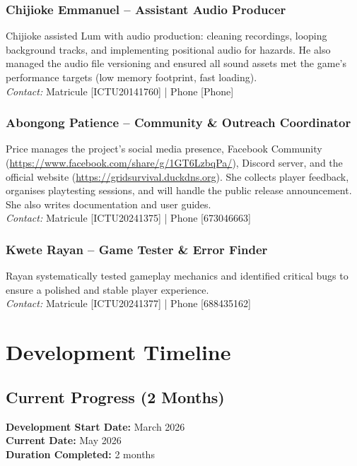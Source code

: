 \documentclass[12pt,a4paper]{article}
\begin{document}
\subsubsection*{Chijioke Emmanuel – Assistant Audio Producer}
Chijioke assisted Lum with audio production: cleaning recordings, looping background tracks, and implementing positional audio for hazards. He also managed the audio file versioning and ensured all sound assets met the game’s performance targets (low memory footprint, fast loading). \\
\textit{Contact:} Matricule [ICTU20141760] | Phone [Phone]

\subsubsection*{Abongong Patience – Community \& Outreach Coordinator}
Price manages the project’s social media presence, Facebook Community (\url{https://www.facebook.com/share/g/1GT6LzbqPa/}), Discord server, and the official website (\url{https://gridsurvival.duckdns.org}). She collects player feedback, organises playtesting sessions, and will handle the public release announcement. She also writes documentation and user guides. \\
\textit{Contact:} Matricule [ICTU20241375] | Phone [673046663]

\subsubsection*{Kwete Rayan – Game Tester \& Error Finder}
Rayan systematically tested gameplay mechanics and identified critical bugs to ensure a polished and stable player experience. \\
\textit{Contact:} Matricule [ICTU20241377] | Phone [688435162]

\newpage

\section{Development Timeline}

\subsection{Current Progress (2 Months)}

\textbf{Development Start Date:} March 2026 \\
\textbf{Current Date:} May 2026 \\
\textbf{Duration Completed:} 2 months
\end{document}
